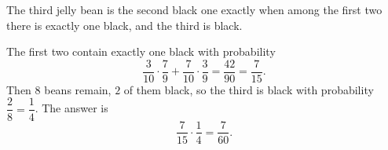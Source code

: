 The third jelly bean is the second black one exactly when among the first two there is exactly one black, and the third is black.

The first two contain exactly one black with probability
\[
\dfrac{3}{10}\cdot\dfrac{7}{9}+\dfrac{7}{10}\cdot\dfrac{3}{9}=\dfrac{42}{90}=\dfrac{7}{15}.
\]
Then $8$ beans remain, $2$ of them black, so the third is black with probability $\dfrac{2}{8}=\dfrac{1}{4}$. The answer is
\[
\dfrac{7}{15}\cdot\dfrac{1}{4}=\boxed{\dfrac{7}{60}}.
\]
